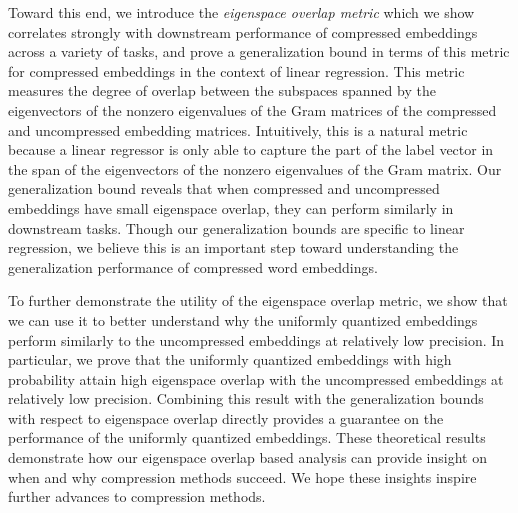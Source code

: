 Toward this end, we introduce the \textit{eigenspace overlap metric} which we show correlates strongly with downstream performance of compressed embeddings across a variety of tasks, and prove a generalization bound in terms of this metric for compressed embeddings in the context of linear regression.
This metric measures the degree of overlap between the subspaces spanned by the eigenvectors of the nonzero eigenvalues of the Gram matrices of the compressed and uncompressed embedding matrices. %
Intuitively, this is a natural metric because a linear regressor is only able to capture the part of the label vector in the span of the eigenvectors of the nonzero eigenvalues of the Gram matrix.
Our generalization bound reveals that when compressed and uncompressed embeddings have small eigenspace overlap, they can perform similarly in downstream tasks.
Though our generalization bounds are specific to linear regression, we believe this is an important step toward understanding the generalization performance of compressed word embeddings.

To further demonstrate the utility of the eigenspace overlap metric, we show that we can use it to better understand why the uniformly quantized embeddings perform similarly to the uncompressed embeddings at relatively low precision.
In particular, we prove that the uniformly quantized embeddings with high probability attain high eigenspace overlap with the uncompressed embeddings at relatively low precision.
Combining this result with the generalization bounds with respect to eigenspace overlap directly provides a guarantee on the performance of the uniformly quantized embeddings.
These theoretical results demonstrate how our eigenspace overlap based analysis can provide insight on when and why compression methods succeed.
We hope these insights inspire further advances to compression methods.



